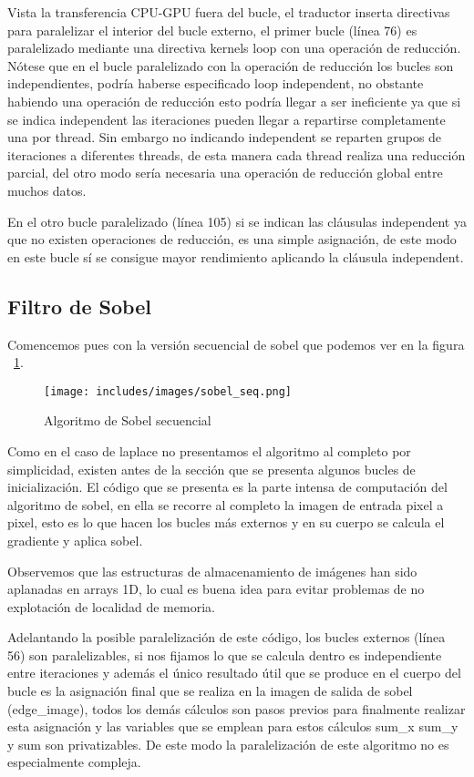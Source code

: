 Vista la transferencia CPU-GPU fuera del bucle, el traductor inserta directivas para paralelizar el interior del bucle externo, el primer bucle (línea 76) es paralelizado mediante una directiva kernels loop con una operación de reducción. Nótese que en el bucle paralelizado con la operación de reducción los bucles son independientes, podría haberse especificado loop independent, no obstante habiendo una operación de reducción esto podría llegar a ser ineficiente ya que si se indica independent las iteraciones pueden llegar a repartirse completamente una por thread. Sin embargo no indicando independent se reparten grupos de iteraciones a diferentes threads, de esta manera cada thread realiza una reducción parcial, del otro modo sería necesaria una operación de reducción global entre muchos datos.

En el otro bucle paralelizado (línea 105) si se indican las cláusulas independent ya que no existen operaciones de reducción, es una simple asignación, de este modo en este bucle sí se consigue mayor rendimiento aplicando la cláusula independent.


\subsection{Filtro de Sobel}

Comencemos pues con la versión secuencial de sobel que podemos ver en la figura ~\ref{fig:Sobelseq}.

\begin{figure}[t]
\centering
\texttt{[image: includes/images/sobel\_seq.png]}
\caption{Algoritmo de Sobel secuencial}
\label{fig:Sobelseq}
\end{figure}

Como en el caso de laplace no presentamos el algoritmo al completo por simplicidad, existen antes de la sección que se presenta algunos bucles de inicialización. El código que se presenta es la parte intensa de computación del algoritmo de sobel, en ella se recorre al completo la imagen de entrada pixel a pixel, esto es lo que hacen los bucles más externos y en su cuerpo se calcula el gradiente y aplica sobel.

Observemos que las estructuras de almacenamiento de imágenes han sido aplanadas en arrays 1D, lo cual es buena idea para evitar problemas de no explotación de localidad de memoria.

Adelantando la posible paralelización de este código, los bucles externos (línea 56) son paralelizables, si nos fijamos lo que se calcula dentro es independiente entre iteraciones y además el único resultado útil que se produce en el cuerpo del bucle es la asignación final que se realiza en la imagen de salida de sobel (edge\_image), todos los demás cálculos son pasos previos para finalmente realizar esta asignación y las variables que se emplean para estos cálculos sum\_x sum\_y y sum son privatizables. De este modo la paralelización de este algoritmo no es especialmente compleja.


